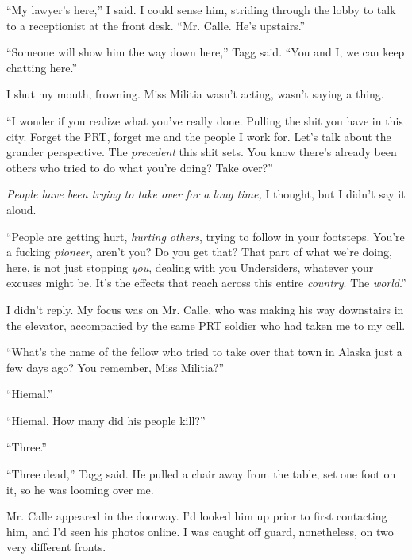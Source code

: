 ``My lawyer's here,'' I said.  I could sense him, striding through the lobby to talk to a receptionist at the front desk.  ``Mr. Calle.  He's upstairs.''



``Someone will show him the way down here,'' Tagg said.  ``You and I, we can keep chatting here.''



I shut my mouth, frowning.  Miss Militia wasn't acting, wasn't saying a thing.



``I wonder if you realize what you've really done.  Pulling the shit you have in this city.  Forget the PRT, forget me and the people I work for.  Let's talk about the grander perspective.  The \emph{precedent} this shit sets.  You know there's already been others who tried to do what you're doing?  Take over?''



\emph{People have been trying to take over for a long time, }I thought, but I didn't say it aloud.



``People are getting hurt, \emph{hurting others}, trying to follow in your footsteps.  You're a fucking \emph{pioneer}, aren't you?  Do you get that?  That part of what we're doing, here, is not just stopping \emph{you}, dealing with you Undersiders, whatever your excuses might be.  It's the effects that reach across this entire \emph{country}.  The \emph{world}.''



I didn't reply.  My focus was on Mr. Calle, who was making his way downstairs in the elevator, accompanied by the same PRT soldier who had taken me to my cell.



``What's the name of the fellow who tried to take over that town in Alaska just a few days ago?  You remember, Miss Militia?''



``Hiemal.''



``Hiemal.  How many did his people kill?''



``Three.''



``Three dead,'' Tagg said.  He pulled a chair away from the table, set one foot on it, so he was looming over me.



Mr. Calle appeared in the doorway.  I'd looked him up prior to first contacting him, and I'd seen his photos online.  I was caught off guard, nonetheless, on two very different fronts.



